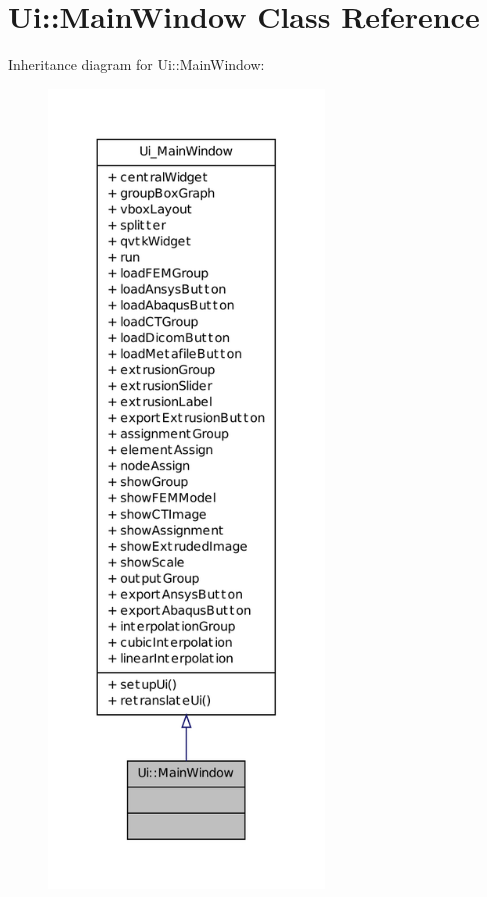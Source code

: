 \hypertarget{class_ui_1_1_main_window}{
\section{Ui::MainWindow Class Reference}
\label{class_ui_1_1_main_window}
}


Inheritance diagram for Ui::MainWindow:
\nopagebreak
\begin{figure}[H]
\begin{center}
\leavevmode
\includegraphics[height=600pt]{class_ui_1_1_main_window__inherit__graph}
\end{center}
\end{figure}


